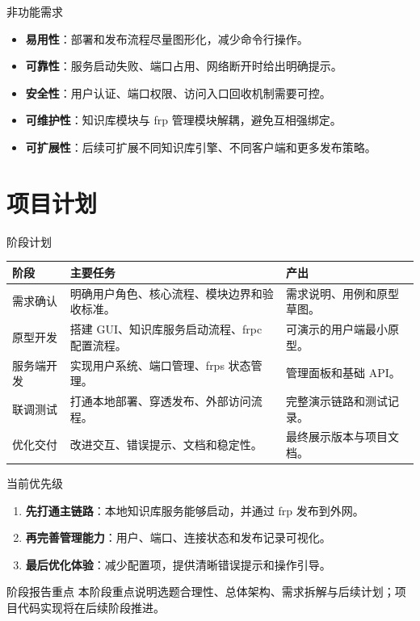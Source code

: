 \documentclass[aspectratio=169]{beamer}
\newcommand{\keypoint}[1]{\textcolor{whu}{\textbf{#1}}}
\begin{document}
\begin{frame}{非功能需求}
    \begin{itemize}
        \item \keypoint{易用性}：部署和发布流程尽量图形化，减少命令行操作。
        \item \keypoint{可靠性}：服务启动失败、端口占用、网络断开时给出明确提示。
        \item \keypoint{安全性}：用户认证、端口权限、访问入口回收机制需要可控。
        \item \keypoint{可维护性}：知识库模块与 frp 管理模块解耦，避免互相强绑定。
        \item \keypoint{可扩展性}：后续可扩展不同知识库引擎、不同客户端和更多发布策略。
    \end{itemize}
\end{frame}

\section{项目计划}

\begin{frame}{阶段计划}
    \small
    \begin{tabularx}{\textwidth}{>{\raggedright\arraybackslash}p{}X X}
        \toprule
        \textbf{阶段} & \textbf{主要任务} & \textbf{产出} \\
        \midrule
        需求确认 & 明确用户角色、核心流程、模块边界和验收标准。 & 需求说明、用例和原型草图。 \\
        原型开发 & 搭建 GUI、知识库服务启动流程、frpc 配置流程。 & 可演示的用户端最小原型。 \\
        服务端开发 & 实现用户系统、端口管理、frps 状态管理。 & 管理面板和基础 API。 \\
        联调测试 & 打通本地部署、穿透发布、外部访问流程。 & 完整演示链路和测试记录。 \\
        优化交付 & 改进交互、错误提示、文档和稳定性。 & 最终展示版本与项目文档。 \\
        \bottomrule
    \end{tabularx}
\end{frame}

\begin{frame}{当前优先级}
    \begin{enumerate}
        \item \keypoint{先打通主链路}：本地知识库服务能够启动，并通过 frp 发布到外网。
        \item \keypoint{再完善管理能力}：用户、端口、连接状态和发布记录可视化。
        \item \keypoint{最后优化体验}：减少配置项，提供清晰错误提示和操作引导。
    \end{enumerate}

    \vspace{0.35cm}
    \begin{alertblock}{阶段报告重点}
        本阶段重点说明选题合理性、总体架构、需求拆解与后续计划；项目代码实现将在后续阶段推进。
    \end{alertblock}
\end{frame}
\end{document}
